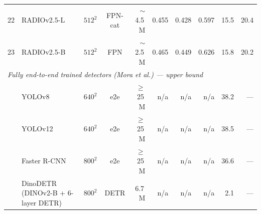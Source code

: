 \begin{table}[t]
\begin{tabular}{clccr rrrrr}
22 & RADIOv2.5-L            & $512^2$      & FPN-cat & $\sim$4.5\,M & 0.455 & 0.428 & 0.597 & 15.5 & 20.4 \\
23 & RADIOv2.5-B            & $512^2$      & FPN     & $\sim$2.5\,M & 0.465 & 0.449 & 0.626 & 15.8 & 20.2 \\
\midrule
\multicolumn{10}{l}{\textit{Fully end-to-end trained detectors (Mora et al.) — upper bound}} \\[2pt]
  & YOLOv8               & $640^2$  & e2e    & $\geq$25\,M  & n/a   & n/a & n/a & 38.2 & --- \\
  & YOLOv12              & $640^2$  & e2e    & $\geq$25\,M  & n/a   & n/a & n/a & 38.5 & --- \\
  & Faster R-CNN         & $800^2$  & e2e    & $\geq$25\,M  & n/a   & n/a & n/a & 36.6 & --- \\
  & DinoDETR (DINOv2-B + 6-layer DETR) & $800^2$ & DETR & 6.7\,M & n/a & n/a & n/a & 2.1 & --- \\
\bottomrule
\end{tabular}
\end{table}



